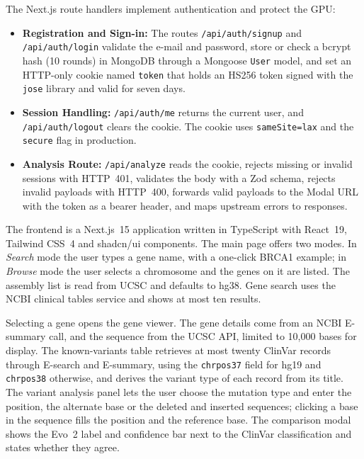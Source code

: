The Next.js route handlers implement authentication and protect the GPU:
\begin{itemize}
\item \textbf{Registration and Sign-in:} The routes \texttt{/api/auth/signup} and \texttt{/api/auth/login} validate the e-mail and password, store or check a bcrypt hash (10 rounds) in MongoDB through a Mongoose \texttt{User} model, and set an HTTP-only cookie named \texttt{token} that holds an HS256 token signed with the \texttt{jose} library and valid for seven days.
\item \textbf{Session Handling:} \texttt{/api/auth/me} returns the current user, and \texttt{/api/auth/logout} clears the cookie. The cookie uses \texttt{sameSite=lax} and the \texttt{secure} flag in production.
\item \textbf{Analysis Route:} \texttt{/api/analyze} reads the cookie, rejects missing or invalid sessions with HTTP~401, validates the body with a Zod schema, rejects invalid payloads with HTTP~400, forwards valid payloads to the Modal URL with the token as a bearer header, and maps upstream errors to responses.
\end{itemize}

The frontend is a Next.js~15 application written in TypeScript with React~19, Tailwind CSS~4 and shadcn/ui components. The main page offers two modes. In \textit{Search} mode the user types a gene name, with a one-click BRCA1 example; in \textit{Browse} mode the user selects a chromosome and the genes on it are listed. The assembly list is read from UCSC and defaults to hg38. Gene search uses the NCBI clinical tables service and shows at most ten results.

Selecting a gene opens the gene viewer. The gene details come from an NCBI E-summary call, and the sequence from the UCSC API, limited to 10,000 bases for display. The known-variants table retrieves at most twenty ClinVar records through E-search and E-summary, using the \texttt{chrpos37} field for hg19 and \texttt{chrpos38} otherwise, and derives the variant type of each record from its title. The variant analysis panel lets the user choose the mutation type and enter the position, the alternate base or the deleted and inserted sequences; clicking a base in the sequence fills the position and the reference base. The comparison modal shows the Evo~2 label and confidence bar next to the ClinVar classification and states whether they agree.

